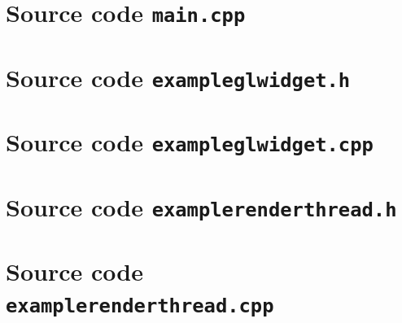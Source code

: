 \documentclass[jou,noapacite]{apa}
\begin{document}
\appendix
\onecolumn
{}
%
\section{Source code \texttt{main.cpp}}
\label{sec:app-a}

\newpage
%
\section{Source code \texttt{exampleglwidget.h}}
\label{sec:app-b}

\newpage
%
\section{Source code \texttt{exampleglwidget.cpp}}
\label{sec:app-c}

\newpage
%
\section{Source code \texttt{examplerenderthread.h}}
\label{sec:app-d}

\newpage
%
\section{Source code \texttt{examplerenderthread.cpp}}
\label{sec:app-e}

\newpage
\end{document}

